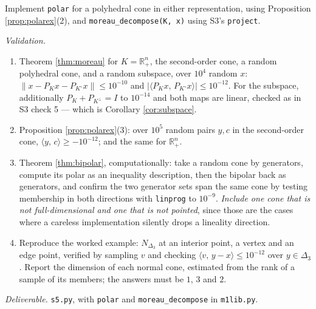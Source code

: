\documentclass[11pt,a4paper]{article}
\theoremstyle{definition}
\theoremstyle{plain}
\theoremstyle{remark}
\newcommand{\R}{\mathbb{R}}
\newcommand{\ip}[2]{\langle #1,\, #2\rangle}
\newcommand{\norm}[1]{\lVert #1\rVert}
\newcommand{\proj}{P}
\newcommand{\Simplex}{\Delta}
\newcommand{\Nc}{N}
\begin{document}
Implement \texttt{polar} for a polyhedral cone in either representation, using Proposition
\ref{prop:polarex}(2), and \texttt{moreau\_decompose(K, x)} using S3's \texttt{project}.

\emph{Validation.}
\begin{enumerate}
\item Theorem \ref{thm:moreau} for $K=\R^n_+$, the second-order cone, a random polyhedral cone,
and a random subspace, over $10^4$ random $x$:
$\norm{x-\proj_Kx-\proj_{K^\circ}x}\le10^{-10}$ and
$|\ip{\proj_Kx}{\proj_{K^\circ}x}|\le10^{-12}$. For the subspace, additionally
$\proj_K+\proj_{K^\perp}=I$ to $10^{-14}$ and both maps are linear, checked as in S3 check 5 ---
which is Corollary \ref{cor:subspace}.
\item Proposition \ref{prop:polarex}(3): over $10^5$ random pairs $y,c$ in the second-order cone,
$\ip{y}{c}\ge-10^{-12}$; and the same for $\R^n_+$.
\item Theorem \ref{thm:bipolar}, computationally: take a random cone by generators, compute its
polar as an inequality description, then the bipolar back as generators, and confirm the two
generator sets span the same cone by testing membership in both directions with
\texttt{linprog} to $10^{-9}$. \emph{Include one cone that is not full-dimensional and one that
is not pointed}, since those are the cases where a careless implementation silently drops a
lineality direction.
\item Reproduce the worked example: $\Nc_{\Simplex_3}$ at an interior point, a vertex and an
edge point, verified by sampling $v$ and checking $\ip{v}{y-x}\le10^{-12}$ over $y\in\Simplex_3$.
Report the dimension of each normal cone, estimated from the rank of a sample of its members;
the answers must be $1$, $3$ and $2$.
\end{enumerate}

\emph{Deliverable.} \texttt{s5.py}, with \texttt{polar} and \texttt{moreau\_decompose} in
\texttt{m1lib.py}.
\end{document}

